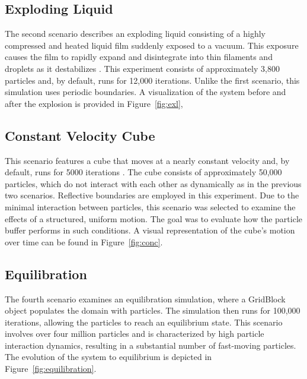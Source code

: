\subsection{Exploding Liquid} The second scenario describes an exploding liquid consisting of a highly compressed and heated liquid film suddenly exposed to a vacuum. This exposure causes the film to rapidly expand and disintegrate into thin filaments and droplets as it destabilizes \parencite{seckler2021autopas}. This experiment consists of approximately 3,800 particles and, by default, runs for 12,000 iterations. Unlike the first scenario, this simulation uses periodic boundaries. A visualization of the system before and after the explosion is provided in Figure~\ref{fig:exl},

\subsection{Constant Velocity Cube} This scenario features a cube that moves at a nearly constant velocity and, by default, runs for 5000 iterations \parencite{gall2023exploration}. The cube consists of approximately 50,000 particles, which do not interact with each other as dynamically as in the previous two scenarios. Reflective boundaries are employed in this experiment. Due to the minimal interaction between particles, this scenario was selected to examine the effects of a structured, uniform motion. The goal was to evaluate how the particle buffer performs in such conditions. A visual representation of the cube's motion over time can be found in Figure~\ref{fig:conc}.

\subsection{Equilibration}
The fourth scenario examines an equilibration simulation, where a GridBlock object populates the domain with particles. The simulation then runs for 100,000 iterations, allowing the particles to reach an equilibrium state. This scenario involves over four million particles and is characterized by high particle interaction dynamics, resulting in a substantial number of fast-moving particles. The evolution of the system to equilibrium is depicted in Figure~\ref{fig:equilibration}.


\vspace{1em} 
\vspace{1em} 
\vspace{1em} 


